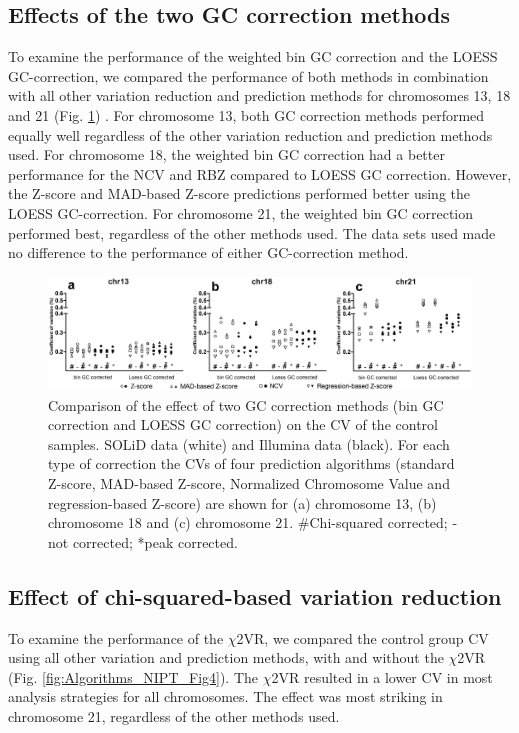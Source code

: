 \subsection{Effects of the two GC correction methods}
To examine the performance of the weighted bin GC correction and the LOESS GC-correction, we compared the performance of both methods in combination with all other variation reduction and prediction methods for chromosomes 13, 18 and 21 (Fig. \ref{fig:Algorithms_NIPT_Fig3}) . 
For chromosome 13, both GC correction methods performed equally well regardless of the other variation reduction and prediction methods used. 
For chromosome 18, the weighted bin GC correction had a better performance for the NCV and RBZ compared to LOESS GC correction. 
However, the Z-score and MAD-based Z-score predictions performed better using the LOESS GC-correction. 
For chromosome 21, the weighted bin GC correction performed best, regardless of the other methods used. 
The data sets used made no difference to the performance of either GC-correction method.

\begin{figure}
	\includegraphics[width=1.0\linewidth]{img/Algorithms_NIPT_Fig3}
	\caption[Comparison of the effect of two GC correction methods]{Comparison of the effect of two GC correction methods (bin GC correction and LOESS GC correction) on the CV of the control samples. SOLiD data (white) and Illumina data (black). For each type of correction the CVs of four prediction algorithms (standard Z-score, MAD-based Z-score, Normalized Chromosome Value and regression-based Z-score) are shown for (a) chromosome 13, (b) chromosome 18 and (c) chromosome 21. \#Chi-squared corrected; -not corrected; *peak corrected.}
	\label{fig:Algorithms_NIPT_Fig3}
\end{figure}

\subsection{Effect of chi-squared-based variation reduction}
To examine the performance of the $\chi$2VR, we compared the control group CV using all other variation and prediction methods, with and without the $\chi$2VR (Fig. \ref{fig:Algorithms_NIPT_Fig4}).
The $\chi$2VR resulted in a lower CV in most analysis strategies for all chromosomes. 
The effect was most striking in chromosome 21, regardless of the other methods used.

